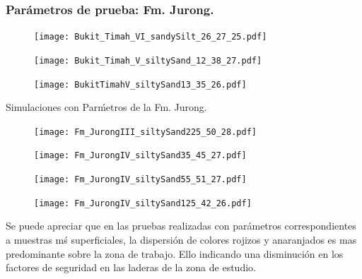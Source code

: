 \subsubsection{Par\'ametros de prueba: Fm. Jurong.}

\begin{figure}[H]
\centering
\begin{minipage}{.45\linewidth}
  \texttt{[image: Bukit\_Timah\_VI\_sandySilt\_26\_27\_25.pdf]}
  \label{fig:bukit1}
\end{minipage}
\hspace{.05\linewidth}
\begin{minipage}{.45\linewidth}
  \texttt{[image: Bukit\_Timah\_V\_siltySand\_12\_38\_27.pdf]}
  \label{fig:bukit2}
\end{minipage}
\begin{minipage}{.45\linewidth}
  \texttt{[image: BukitTimahV\_siltySand13\_35\_26.pdf]}
  \label{fig:bukit3}
\end{minipage}
\end{figure}




Simulaciones con Par\'metros de la Fm. Jurong.


\begin{figure}[H]
\centering
\begin{minipage}{.45\linewidth}
  \texttt{[image: Fm\_JurongIII\_siltySand225\_50\_28.pdf]}
  \label{fig:jurong1}
\end{minipage}
\hspace{.05\linewidth}
\begin{minipage}{.45\linewidth}
  \texttt{[image: Fm\_JurongIV\_siltySand35\_45\_27.pdf]}
  \label{fig:jurong2}
\end{minipage}
\begin{minipage}{.45\linewidth}
  \texttt{[image: Fm\_JurongIV\_siltySand55\_51\_27.pdf]}
  \label{fig:jurong3}
\end{minipage}
\begin{minipage}{.45\linewidth}
  \texttt{[image: Fm\_JurongIV\_siltySand125\_42\_26.pdf]}
  \label{fig:jurong4}
\end{minipage}
\end{figure}


Se puede apreciar que en las pruebas realizadas con par\'ametros correspondientes a muestras m\'s superficiales, la dispersi\'on de colores rojizos y anaranjados es mas predominante sobre la zona  de trabajo. Ello indicando una disminuci\'on en los factores de seguridad en las laderas de la zona de estudio.\par

